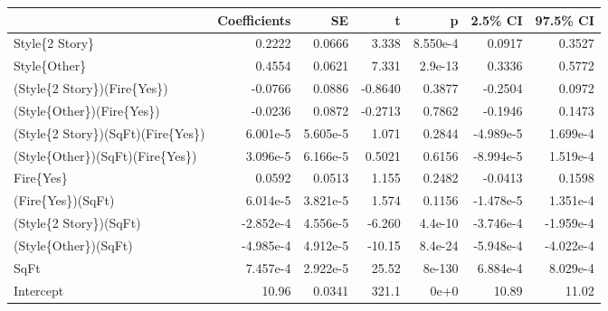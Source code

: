 \begin{tabular}{lrrrrrr}
\toprule
{} &  Coefficients &       SE &       t &        p &   2.5\% CI &  97.5\% CI \\
\midrule
Style\{2 Story\}                    &        0.2222 &   0.0666 &   3.338 & 8.550e-4 &    0.0917 &    0.3527 \\
Style\{Other\}                      &        0.4554 &   0.0621 &   7.331 &  2.9e-13 &    0.3336 &    0.5772 \\
(Style\{2 Story\})(Fire\{Yes\})       &       -0.0766 &   0.0886 & -0.8640 &   0.3877 &   -0.2504 &    0.0972 \\
(Style\{Other\})(Fire\{Yes\})         &       -0.0236 &   0.0872 & -0.2713 &   0.7862 &   -0.1946 &    0.1473 \\
(Style\{2 Story\})(SqFt)(Fire\{Yes\}) &      6.001e-5 & 5.605e-5 &   1.071 &   0.2844 & -4.989e-5 &  1.699e-4 \\
(Style\{Other\})(SqFt)(Fire\{Yes\})   &      3.096e-5 & 6.166e-5 &  0.5021 &   0.6156 & -8.994e-5 &  1.519e-4 \\
Fire\{Yes\}                         &        0.0592 &   0.0513 &   1.155 &   0.2482 &   -0.0413 &    0.1598 \\
(Fire\{Yes\})(SqFt)                 &      6.014e-5 & 3.821e-5 &   1.574 &   0.1156 & -1.478e-5 &  1.351e-4 \\
(Style\{2 Story\})(SqFt)            &     -2.852e-4 & 4.556e-5 &  -6.260 &  4.4e-10 & -3.746e-4 & -1.959e-4 \\
(Style\{Other\})(SqFt)              &     -4.985e-4 & 4.912e-5 &  -10.15 &  8.4e-24 & -5.948e-4 & -4.022e-4 \\
SqFt                              &      7.457e-4 & 2.922e-5 &   25.52 &   8e-130 &  6.884e-4 &  8.029e-4 \\
Intercept                         &         10.96 &   0.0341 &   321.1 &     0e+0 &     10.89 &     11.02 \\
\bottomrule
\end{tabular}
